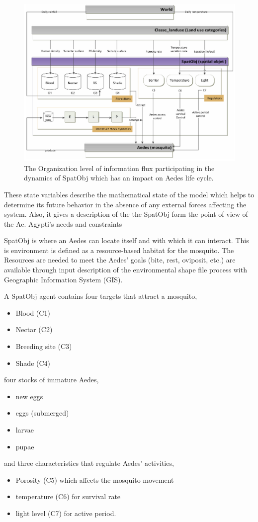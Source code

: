\begin{figure}
  \centering \includegraphics[width = 17cm]{fig1.PNG}
  \caption{The Organization level of information flux participating in the dynamics of SpatObj which has an impact on Aedes life cycle.}
\end{figure}

These state variables describe the mathematical state of the model which helps to determine its future behavior in the absence of any external forces affecting the system. Also, it gives a description of the the SpatObj form the point of view of the Ae. Agypti's needs and constraints

SpatObj is where an Aedes can locate itself and with which it can interact. This is environment is defined as a resource-based habitat for the mosquito. The Resources are needed to meet the Aedes' goals (bite, rest, oviposit, etc.) are available through input description of the environmental shape file process with Geographic Information System (GIS).

A SpatObj agent contains four targets that attract a mosquito,
\begin{itemize}
    \item Blood (C1)
    \item Nectar (C2)
    \item Breeding site (C3)
    \item Shade (C4)
\end{itemize}
four stocks of immature Aedes,
\begin{itemize}
    \item new eggs
    \item eggs (submerged)
    \item larvae
    \item pupae
\end{itemize}
and three characteristics that regulate Aedes' activities,
\begin{itemize}
    \item Porosity (C5) which affects the mosquito movement
    \item temperature (C6) for survival rate
    \item light level (C7) for active period. 
\end{itemize}


